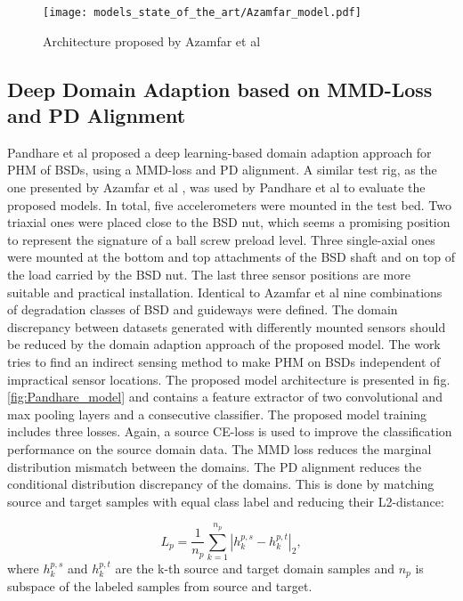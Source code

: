 \begin{figure}[H]
  \centering
  \texttt{[image: models\_state\_of\_the\_art/Azamfar\_model.pdf]}
  \caption{Architecture proposed by Azamfar et al \cite{AZAMFAR2020103932}}
  \label{fig:Azamfar_model}
\end{figure}


\subsection{Deep Domain Adaption based on MMD-Loss and PD Alignment}
Pandhare et al \cite{Pandhare2021} proposed a deep learning-based domain adaption approach for PHM of BSDs, using a MMD-loss and PD alignment. A similar test rig, as the one presented by Azamfar et al \cite{AZAMFAR2020103932}, was used by Pandhare et al to evaluate the proposed models. In total, five accelerometers were mounted in the test bed. Two triaxial ones were placed close to the BSD nut, which seems a promising position to represent the signature of a ball screw preload level. Three single-axial ones were mounted at the bottom and top attachments of the BSD shaft and on top of the load carried by the BSD nut. The last three sensor positions are more suitable and practical installation. Identical to Azamfar et al \cite{AZAMFAR2020103932} nine combinations of degradation classes of BSD and guideways were defined. The domain discrepancy between datasets generated with differently mounted sensors should be reduced by the domain adaption approach of the proposed model. The work tries to find an indirect sensing method to make PHM on BSDs independent of impractical sensor locations. The proposed model architecture is presented in fig. \ref{fig:Pandhare_model} and contains a feature extractor of two convolutional and max pooling layers and a consecutive classifier. The proposed model training includes three losses. Again, a source CE-loss is used to improve the classification performance on the source domain data. The MMD loss reduces the marginal distribution mismatch between the domains. The PD alignment reduces the conditional distribution discrepancy of the domains. This is done by matching source and target samples with equal class label and reducing their L2-distance: 

\begin{equation}
    L_{p} = \frac{1}{n_{p}}\sum_{k=1}^{n_{p}}|h_{k}^{p,s}-h_{k}^{p,t}|_{2}, 
\end{equation}
where $h_{k}^{p,s}$ and $h_{k}^{p,t}$ are the k-th source and target domain samples and $n_{p}$ is subspace of the labeled samples from source and target. 

